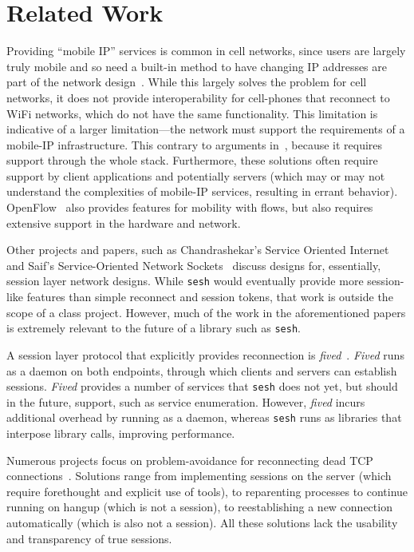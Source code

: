 \documentclass[twocolumn,11pt]{article}
\newcommand{\sesh}{\texttt{sesh}\xspace}
\begin{document}
\section{Related Work}

Providing ``mobile IP'' services is common in cell networks, since users are
largely truly mobile and so need a built-in method to have changing IP addresses
are part of the network design~\cite{ltemob,mobileip,Kurose}. While this largely
solves the problem for cell networks, it does not provide interoperability for
cell-phones that reconnect to WiFi networks, which do not have the same
functionality. This limitation is indicative of a larger limitation---the
network must support the requirements of a mobile-IP infrastructure. This
contrary to arguments in~\cite{Saltzer}, because it requires support through the
whole stack. Furthermore, these solutions often require support by client
applications and potentially servers (which may or may not understand the
complexities of mobile-IP services, resulting in errant behavior).
OpenFlow~\cite{McKeown} also
provides features for mobility with flows, but also requires extensive support
in the hardware and network.

Other projects and papers, such as Chandrashekar's Service Oriented
Internet~\cite{chandrashekar2003service} and Saif's Service-Oriented Network
Sockets~\cite{Saif} discuss designs for, essentially, session layer network designs.
While \sesh would eventually provide more session-like features than
simple reconnect and session tokens, that work is outside the scope of a class
project. However, much of the work in the aforementioned papers is extremely
relevant to the future of a library such as \sesh.

A session layer protocol that explicitly provides reconnection is
\textit{fived}~\cite{wasptr-15-01}. \textit{Fived} runs as a daemon on both
endpoints, through which clients and servers can establish sessions.
\textit{Fived} provides a number of services that \sesh does not yet,
but should in the future, support, such as service enumeration. However,
\textit{fived} incurs additional overhead by running as a daemon, whereas
\sesh runs as libraries that interpose library calls, improving
performance.

Numerous projects focus on problem-avoidance for reconnecting dead TCP
connections~\cite{mosh,autossh,screen,tmux}. Solutions range from implementing
sessions on the server (which require forethought and explicit use of tools), to
reparenting processes to continue running on hangup (which is not a session), to
reestablishing a new connection automatically (which is also not a session). All
these solutions lack the usability and transparency of true sessions.
\end{document}
